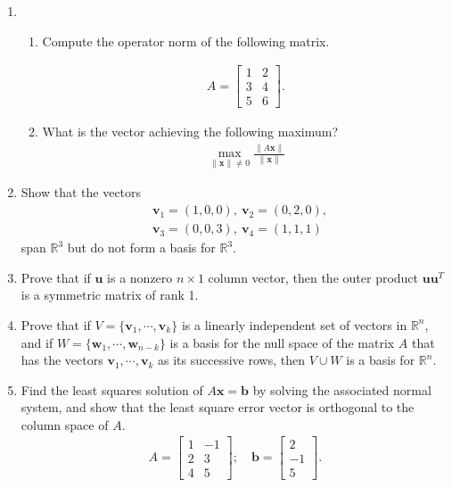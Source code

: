 \documentclass{article}
\begin{document}
\begin{enumerate}
\newpage
\item 	
\begin{enumerate}
\item
Compute the operator norm of the following matrix.
	
	\begin{align*}
	A=\left[\begin{array}{ll}1 &2\\3&4\\5&6\end{array}\right].	
	\end{align*}

\item What is the vector achieving the following maximum?
	\begin{align*}
	\max_{\|\mathbf{x}\|\neq 0} \frac{\|A\mathbf{x}\|}{\|\mathbf{x}\|}
	\end{align*}

\end{enumerate}

\item Show that the vectors
	\begin{align*}
	&\mathbf{v}_1=(1,0,0),~\mathbf{v}_2=(0,2,0),\\
	&\mathbf{v}_3=(0,0,3),~\mathbf{v}_4=(1,1,1)
	\end{align*}
span $\mathbb{R}^3$ but do not form a basis for $\mathbb{R}^3$.


\item
Prove that if $\mathbf{u}$ is a nonzero $n\times 1 $ column vector, then the outer product $\mathbf{u}\mathbf{u}^T$ is a symmetric matrix of rank 1.


\item
Prove that if $V=\{\mathbf{v}_1,\cdots,\mathbf{v}_k\}$ is a linearly independent set of vectors in $\mathbb{R}^n$, and if $W=\{\mathbf{w}_1,\cdots,\mathbf{w}_{n-k}\}$ is a basis for the null space of the matrix $A$ that has the vectors $\mathbf{v}_1,\cdots,\mathbf{v}_k$ as its successive rows, then 
$V\cup W$ is a basis for $\mathbb{R}^n$.



\item
Find the least squares solution of $A\mathbf{x}=\mathbf{b}$ by solving the associated normal system,
and show that the least square error vector is orthogonal to the column space of $A$.
	\begin{align*}
	A=\left[ \begin{array}{ll} 1&-1 \\ 2&3 \\ 4&5 \end{array}\right]; \quad\mathbf{b}=\left[\begin{array}{l} 2\\-1\\5\end{array}\right].	
	\end{align*}
	


\end{enumerate}
\end{document}
